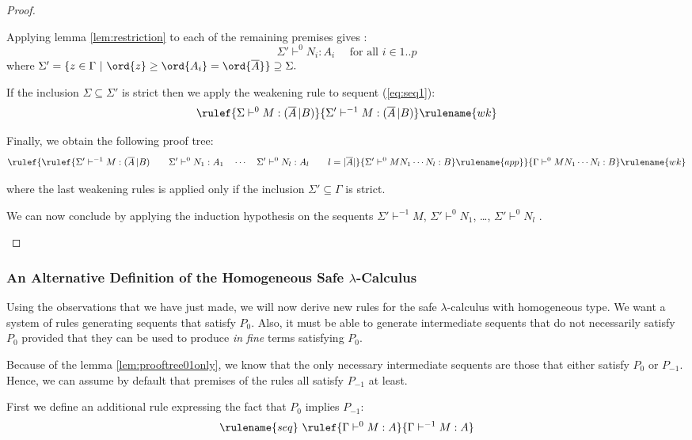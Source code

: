 \begin{proof}
\begin{itemize}
Applying lemma \ref{lem:restriction} to each of the remaining
premises gives  :
$$ \Sigma' \vdash^0 N_i : A_i \quad \mbox{ for all } i \in 1..p$$
where $\Sigma' = \{ z \in \Gamma \ | \ \ord{z} \geq \ord{A_i} =
\ord{\overline{A}} \} \supseteq \Sigma.$

If the inclusion $\Sigma \subseteq \Sigma'$ is strict then we apply the weakening rule to sequent (\ref{eq:seq1}):
$$ \rulef{\Sigma \vdash^0 M : (\overline{A} \, | B)}{\Sigma' \vdash^{-1} M : (\overline{A} \, | B)} \rulename{wk} $$

Finally, we obtain the following proof tree:
$$  \rulef{
        \rulef{
            { \Sigma' \vdash^{-1} M : (\overline{A} \, | B)
            \qquad
            \Sigma' \vdash^0 N_1 : A_1 \quad \cdots \quad \Sigma' \vdash^0 N_{l} : A_l \qquad l = |\overline{A}|
            }
        }
        {
            \Sigma' \vdash^0 M N_1 \cdots N_{l} : B
        } \rulename{app}
    }
    {
         \Gamma \vdash^0 M N_1 \cdots N_{l} : B
    } \rulename{wk}
$$

where the last weakening rules is applied only if the inclusion $\Sigma' \subseteq \Gamma$ is strict.

We can now conclude by applying the induction hypothesis on the
sequents $\Sigma' \vdash^{-1} M$, $\Sigma' \vdash^0 N_1$, \ldots,
$\Sigma' \vdash^0 N_l$ .
\end{itemize}
\end{proof}

\subsubsection{An Alternative Definition of the Homogeneous Safe $\lambda$-Calculus}

Using the observations that we have just made, we will now derive
new rules for the safe $\lambda$-calculus with homogeneous type. We
want a system of rules generating sequents that satisfy $P_0$. Also,
it must be able to generate intermediate sequents that do not
necessarily satisfy $P_0$ provided that they can be used to produce
\emph{in fine} terms satisfying $P_0$.

Because of the lemma \ref{lem:prooftree01only}, we know that the
only necessary intermediate sequents are those that either satisfy
$P_0$ or $P_{-1}$. Hence, we can assume by default that premises of
the rules all satisfy $P_{-1}$ at least.

First we define an additional rule expressing the fact that $P_0$
implies $P_{-1}$:
$$ \rulename{seq} \  \rulef{\Gamma \vdash^{0} M : A}{\Gamma \vdash^{-1} M : A} $$

